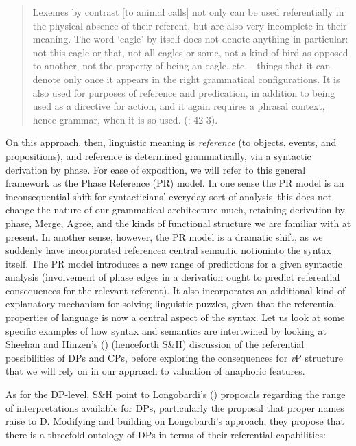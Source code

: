 \documentclass[output=paper
,modfonts
,nonflat
]{langsci/langscibook}
\begin{document}
\begin{quote}

Lexemes by contrast [to animal calls] not only can be used referentially in the physical absence of their referent, but are also very incomplete in their meaning. The word ‘eagle’ by itself does not denote anything in particular: not this eagle or that, not all eagles or some, not a kind of bird as opposed to another, not the property of being an eagle, etc.—things that it can denote only once it appears in the right grammatical configurations. It is also used for purposes of reference and predication, in addition to being used as a directive for action, and it again requires a phrasal context, hence grammar, when it is so used. (\citealt{HinzenSheehan:2013}: 42-3). 

\end{quote}

\noindent On this approach, then, linguistic meaning is \textit{reference} (to objects, events, and propositions), and reference is determined grammatically, via a syntactic derivation by phase. For ease of exposition, we will refer to this general framework as the Phase Reference (PR) model. In one sense the PR model is an inconsequential shift for syntacticians’ everyday sort of analysis–this does not change the nature of our grammatical architecture much, retaining derivation by phase, Merge, Agree, and the kinds of functional structure we are familiar with at present. In another sense, however, the PR model is a dramatic shift, as we suddenly have incorporated reference\textemdash a central semantic notion\textemdash into the syntax itself. The PR model introduces a new range of predictions for a given syntactic analysis (involvement of phase edges in a derivation ought to predict referential consequences for the relevant referent). It also incorporates an additional kind of explanatory mechanism for solving linguistic puzzles, given that the referential properties of language is now a central aspect of the syntax. Let us look at some specific examples of how syntax and semantics are intertwined by looking at Sheehan and Hinzen’s (\citeyear{SheehanHinzen:2011}) (henceforth S\&H) discussion of the referential possibilities of DPs and CPs, before exploring the consequences for \textit{v}P structure that we will rely on in our approach to valuation of anaphoric features.  

As for the DP-level, S\&H point to Longobardi’s (\citeyear{Longobardi:1994,Longobardi:2005}) proposals regarding the range of interpretations available for DPs, particularly the proposal that proper names raise to D. Modifying and building on Longobardi’s approach, they propose that there is a threefold ontology of DPs in terms of their referential capabilities: 
\end{document}
